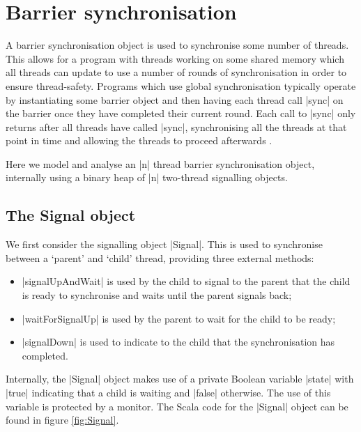 \section{Barrier synchronisation}
\inlineScala

A barrier synchronisation object is used to synchronise some number of threads. This allows for a program with threads working on some shared memory which all threads can update to use a number of rounds of synchronisation in order to ensure thread-safety. Programs which use global synchronisation typically operate by instantiating some barrier object and then having each thread call |sync| on the barrier once they have completed their current round. Each call to |sync| only returns after all threads have called |sync|, synchronising all the threads at that point in time and allowing the threads to proceed afterwards \cite{CP}.

Here we model and analyse an |n| thread barrier synchronisation object, internally using a binary heap of |n| two-thread signalling objects.

\subsection{The Signal object}

We first consider the signalling object |Signal|. This is used to synchronise between a `parent' and `child' thread, providing three external methods:

\begin{itemize}
  \item |signalUpAndWait| is used by the child to signal to the parent that the child is ready to synchronise and waits until the parent signals back;
  \item |waitForSignalUp| is used by the parent to wait for the child to be ready;
  \item |signalDown| is used to indicate to the child that the synchronisation has completed.
\end{itemize}

Internally, the |Signal| object makes use of a private Boolean variable |state| with |true| indicating that a child is waiting and |false| otherwise. The use of this variable is protected by a monitor. The Scala code for the |Signal| object can be found in figure \ref{fig:Signal}.

